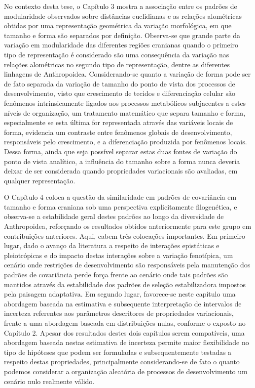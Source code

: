 \documentclass[12pt,twoside]{report}
\begin{document}
No contexto desta tese, o Capítulo 3 mostra a associação entre os
padrões de modularidade observados sobre distâncias euclidianas e as
relações alométricas obtidas por uma representação geométrica da
variação morfológica, em que tamanho e forma são separados por
definição. Observa-se que grande parte da variação em modularidade das
diferentes regiões cranianas quando o primeiro tipo de representação é
considerado são uma consequência da variação nas relações alométricas no
segundo tipo de representação, dentre as diferentes linhagens de
Anthropoidea. Considerando-se quanto a variação de forma pode ser de
fato separada da variação de tamanho do ponto de vista dos processos de
desenvolvimento, visto que crescimento de tecidos e diferenciação
celular são fenômenos intrinsicamente ligados aos processos metabólicos
subjacentes a estes níveis de organização, um tratamento matemático que
separa tamanho e forma, especialmente se esta última for representada
através das variáveis locais de forma, evidencia um contraste entre
fenômenos globais de desenvolvimento, responsáveis pelo crescimento, e a
diferenciação produzida por fenômenos locais. Dessa forma, ainda que
seja possível separar estas duas fontes de variação do ponto de vista
analítico, a influência do tamanho sobre a forma nunca deveria deixar de
ser considerada quando propriedades variacionais são avaliadas, em
qualquer representação.

O Capítulo 4 coloca a questão da similaridade em padrões de covariância
em tamanho e forma craniana sob uma perspectiva explicitamente
filogenética, e observa-se a estabilidade geral destes padrões ao longo
da diversidade de Anthropoidea, reforçando os resultados obtidos
anteriormente para este grupo em contribuições anteriores. Aqui, cabem
três colocações importantes. Em primeiro lugar, dado o avanço da
literatura a respeito de interações epistáticas e pleiotrópicas e do
impacto destas interações sobre a variação fenotípica, um cenário onde
restrições de desenvolvimento são responsáveis pela manutenção dos
padrões de covariância perde força frente ao cenário onde tais padrões
são mantidos através da estabilidade dos padrões de seleção
estabilizadora impostos pela paisagem adaptativa. Em segundo lugar,
favorece-se neste capítulo uma abordagem baseada na estimativa e
subsequente interpretação de intervalos de incerteza referentes aos
parâmetros descritores de propriedades variacionais, frente a uma
abordagem baseada em distribuições nulas, conforme o exposto no Capítulo
2. Apesar dos resultados destes dois capítulos serem compatíveis, uma
abordagem baseada nestas estimativa de incerteza permite maior
flexibilidade no tipo de hipóteses que podem ser formuladas e
subsequentemente testadas a respeito destas propriedades, principalmente
considerando-se de fato o quanto podemos considerar a organização
aleatória de processos de desenvolvimento um cenário nulo realmente
válido.
\end{document}

